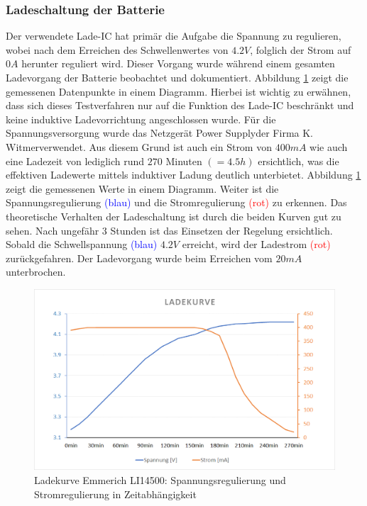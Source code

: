 \subsubsection*{Ladeschaltung der Batterie}\label{sec:batterieLadungVal}
Der verwendete Lade-IC hat primär die Aufgabe die Spannung zu regulieren, wobei nach dem Erreichen des Schwellenwertes von $4.2V$, folglich der Strom auf $0A$ herunter reguliert wird. Dieser Vorgang wurde während einem gesamten Ladevorgang der Batterie beobachtet und dokumentiert. Abbildung \ref{fig:LadekurveEmmerich} zeigt die gemessenen Datenpunkte in einem Diagramm. Hierbei ist wichtig zu erwähnen, dass sich dieses Testverfahren nur auf die Funktion des Lade-IC beschränkt und keine induktive Ladevorrichtung angeschlossen wurde. Für die Spannungsversorgung wurde das Netzgerät \glqq Power Supply\grqq\thickspace der Firma \glqq K. Witmer\grqq\thickspace verwendet. Aus diesem Grund ist auch ein Strom von $400mA$ wie auch eine Ladezeit von lediglich rund $270$ Minuten $(\hat{=} 4.5h)$ ersichtlich, was die effektiven Ladewerte mittels induktiver Ladung deutlich unterbietet. Abbildung \ref{fig:LadekurveEmmerich} zeigt die gemessenen Werte in einem Diagramm. Weiter ist die Spannungsregulierung \textcolor{blue}{(blau)} und die Stromregulierung \textcolor{red}{(rot)} zu erkennen. Das theoretische Verhalten der Ladeschaltung ist durch die beiden Kurven gut zu sehen. Nach ungefähr 3 Stunden ist das Einsetzen der Regelung ersichtlich. Sobald die Schwellspannung \textcolor{blue}{(blau)} $4.2V$ erreicht, wird der Ladestrom \textcolor{red}{(rot)} zurückgefahren. Der Ladevorgang wurde beim Erreichen vom $20mA$ unterbrochen.

\begin{figure}[H]
	\begin{center}
		\includegraphics[width=120mm]{data/LadekurveEmmerich.png}
		\caption[Ladekurve Emmerich LI14500]{Ladekurve Emmerich LI14500: Spannungsregulierung und Stromregulierung in Zeitabhängigkeit} %
		\label{fig:LadekurveEmmerich}
	\end{center}
\end{figure}

